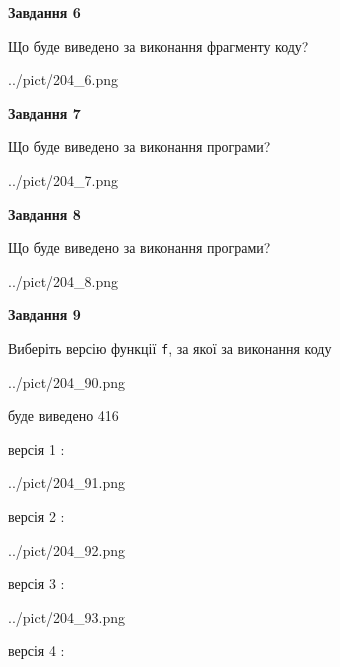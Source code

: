 \documentclass[12pt, ukrainian]{article}
\def\code#1{\Verb!#1!}
\begin{document}
{\begin {large}
{\begin {center}\textbf{Завдання 6}\end {center}}

Що буде виведено за виконання фрагменту коду?\par
\begin{center}
	{../pict/204_6.png}
\end{center}
\newpage

{\begin {center}\textbf{Завдання 7}\end {center}}

Що буде виведено за виконання програми?\par
\begin{center}
	{../pict/204_7.png}
\end{center}
\newpage

{\begin {center}\textbf{Завдання 8}\end {center}}

Що буде виведено за виконання програми?\par
\begin{center}
	{../pict/204_8.png}
\end{center}
\newpage

{\begin {center}\textbf{Завдання 9}\end {center}}

Виберіть версію функції \code{f}, за якої за виконання коду
\begin{center}
	{../pict/204_90.png}
\end{center}
буде виведено 416

\vspace{5mm}
версія 1 :

\begin{center}
	{../pict/204_91.png}
\end{center}
версія 2 :

\begin{center}
	{../pict/204_92.png}
\end{center}
версія 3 :

\begin{center}
	{../pict/204_93.png}
\end{center}
версія 4 :


\end{large}}
\end{document}
